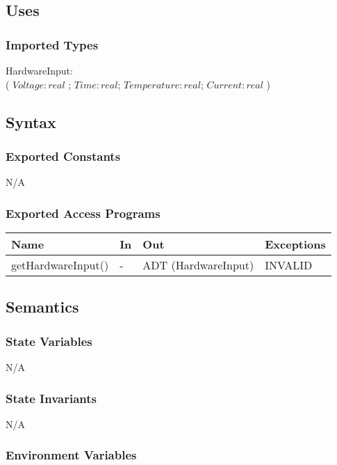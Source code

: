 \documentclass[12pt, titlepage]{article}
\begin{document}
\subsection{Uses}

\subsubsection{Imported Types}
HardwareInput: \\
( $Voltage: real $ ; $Time: real$; $Temperature: real$; $Current: real$ )

\subsection{Syntax}

\subsubsection{Exported Constants}
N/A

\subsubsection{Exported Access Programs}

\begin{center}
\begin{tabular}{p{4cm} p{2cm} p{6cm} p{2cm}}
\hline
\textbf{Name} & \textbf{In} & \textbf{Out} & \textbf{Exceptions} \\
\hline
getHardwareInput() & - & ADT (HardwareInput) & INVALID \\
\hline
\end{tabular}
\end{center}

\subsection{Semantics}

\subsubsection{State Variables}
N/A

\subsubsection{State Invariants}
N/A

\subsubsection{Environment Variables}
\end{document}
